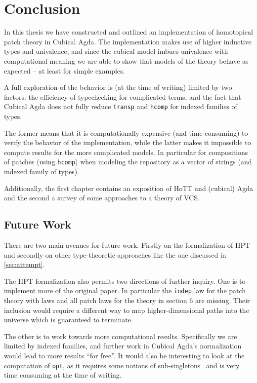 \chapter{Conclusion}

In this thesis we have constructed and outlined an implementation of homotopical
patch theory in Cubical Agda. The implementation makes use of higher inductive
types and univalence, and since the cubical model imbues univalence with
computational meaning we are able to show that models of the theory behave as
expected -- at least for simple examples.

A full exploration of the behavior is (at the time of writing) limited by two
factors: the efficiency of typechecking for complicated terms, and the fact that
Cubical Agda does not fully reduce \texttt{transp} and \texttt{hcomp} for
indexed families of types.

The former means that it is computationally expensive (and time consuming) to
verify the behavior of the implementation, while the latter makes it impossible
to compute results for the more complicated models. In particular for
compositions of patches (using \texttt{hcomp}) when modeling the repository as a
vector of strings (and indexed family of types).

Additionally, the first chapter contains an exposition of HoTT and (cubical)
Agda and the second a survey of some approaches to a theory of VCS.

\section{Future Work}

There are two main avenues for future work. Firstly on the formalization of HPT
and secondly on other type-theoretic approaches like the one discussed in
\autoref{sec:attempt}.

The HPT formalization also permits two directions of further inquiry. One is to
implement more of the original paper. In particular the \texttt{indep} law for
the patch theory with laws and all patch laws for the theory in section 6 are
missing. Their inclusion would require a different way to map higher-dimensional
paths into the universe which is guaranteed to terminate.

The other is to work towards more computational results.
Specifically we are limited by indexed families, and further work in Cubical
Agda's normalization would lead to more results ``for free''. It would also be
interesting to look at the computation of \texttt{opt}, as it requires some
notions of sub-singletons~\cite{Angiuli2016} and is very time consuming at the
time of writing.

